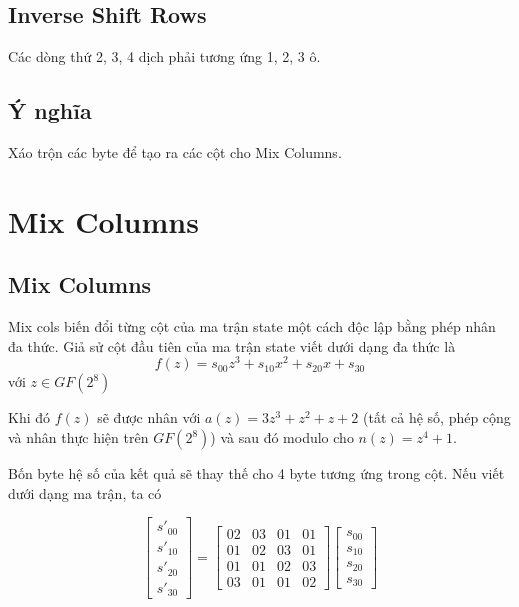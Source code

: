 \subsection{Inverse Shift Rows}

Các dòng thứ 2, 3, 4 dịch phải tương ứng 1, 2, 3 ô.

\subsection{Ý nghĩa}

Xáo trộn các byte để tạo ra các cột cho Mix Columns.

\section{Mix Columns}

\subsection{Mix Columns}

Mix cols biến đổi từng cột của ma trận state một cách độc lập bằng phép nhân đa thức. Giả sử cột đầu tiên của ma trận state viết dưới dạng đa thức là
\[f(z) = s_{00} z^3 + s_{10} x^2 + s_{20} x + s_{30} \] với $z \in GF(2^8)$

Khi đó $f(z)$ sẽ được nhân với $a(z) = 3z^3 + z^2 + z + 2$ (tất cả hệ số, phép cộng và nhân thực hiện trên $GF(2^8)$) và sau đó modulo cho $n(z) = z^4 + 1$.

Bốn byte hệ số của kết quả sẽ thay thế cho 4 byte tương ứng trong cột. Nếu viết dưới dạng ma trận, ta có

\[ \begin{bmatrix}
    s'_{00} \\ s'_{10} \\ s'_{20} \\ s'_{30}
\end{bmatrix} = \begin{bmatrix}
    02 & 03 & 01 & 01 \\
    01 & 02 & 03 & 01 \\
    01 & 01 & 02 & 03 \\
    03 & 01 & 01 & 02
\end{bmatrix} 
\begin{bmatrix}
    s_{00} \\ s_{10} \\ s_{20} \\ s_{30}
\end{bmatrix}\]


